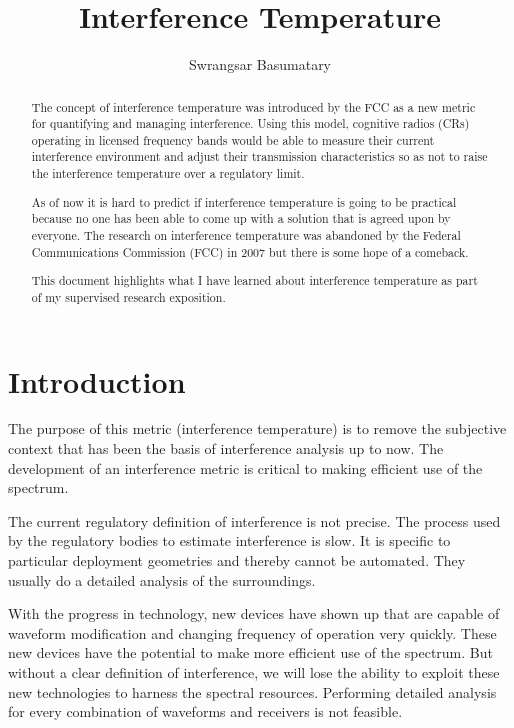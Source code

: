 \documentclass[12pt]{article}
\title{Interference Temperature}
\author{Swrangsar Basumatary}
\begin{document}
\maketitle

\begin{abstract}

The concept of interference temperature was introduced by the FCC as a new metric for quantifying and managing interference. Using this model, cognitive radios (CRs) operating in licensed frequency bands would be able to measure their current interference environment and adjust their transmission characteristics so as not to raise the interference temperature over a regulatory limit.

As of now it is hard to predict if interference temperature is going to be practical because no one has been able to come up with a solution that is agreed upon by everyone. The research on interference temperature was abandoned by the Federal Communications Commission (FCC) in 2007 but there is some hope of a comeback.

This document highlights what I have learned about interference temperature as part of my supervised research exposition.

\end{abstract}

\section{Introduction}

The purpose of this metric (interference temperature) is to remove the subjective context that has been the basis of interference analysis up to now\cite{kolodzy2006}. The development of an interference metric is critical to making efficient use of the spectrum.

The current regulatory definition of interference is not precise. The process used by the regulatory bodies to estimate interference is slow. It is specific to particular deployment geometries and thereby cannot be automated. They usually do a  detailed analysis of the surroundings.

With the progress in technology, new devices have shown up that are capable of waveform modification and changing frequency of operation very quickly. These new devices have the potential to make more efficient use of the spectrum. But without a clear definition of interference, we will lose the ability to exploit these new technologies to harness the spectral resources. Performing detailed analysis for every combination of waveforms and receivers is not feasible.
\end{document}
